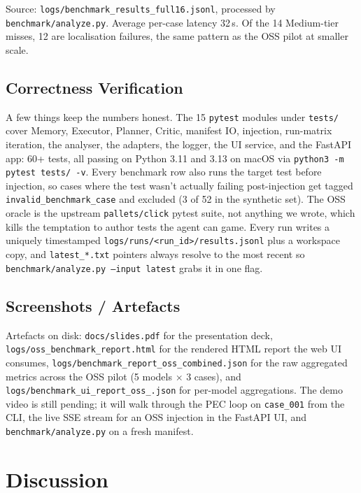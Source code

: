 \documentclass[11pt,letterpaper]{article}
\begin{document}
Source: \texttt{logs/benchmark\_results\_full16.jsonl}, processed by \texttt{benchmark/analyze.py}. Average per-case latency 32\,s. Of the 14 Medium-tier misses, 12 are localisation failures, the same pattern as the OSS pilot at smaller scale.

\subsection{Correctness Verification}

A few things keep the numbers honest. The 15 \texttt{pytest} modules under \texttt{tests/} cover Memory, Executor, Planner, Critic, manifest IO, injection, run-matrix iteration, the analyser, the adapters, the logger, the UI service, and the FastAPI app: 60+ tests, all passing on Python 3.11 and 3.13 on macOS via \texttt{python3 -m pytest tests/ -v}. Every benchmark row also runs the target test before injection, so cases where the test wasn't actually failing post-injection get tagged \texttt{invalid\_benchmark\_case} and excluded (3 of 52 in the synthetic set). The OSS oracle is the upstream \texttt{pallets/click} pytest suite, not anything we wrote, which kills the temptation to author tests the agent can game. Every run writes a uniquely timestamped \texttt{logs/runs/<run\_id>/results.jsonl} plus a workspace copy, and \texttt{latest\_*.txt} pointers always resolve to the most recent so \texttt{benchmark/analyze.py --input latest} grabs it in one flag.

\subsection{Screenshots / Artefacts}

Artefacts on disk: \texttt{docs/slides.pdf} for the presentation deck, \texttt{logs/oss\_\allowbreak benchmark\_\allowbreak report.html} for the rendered HTML report the web UI consumes, \texttt{logs/benchmark\_\allowbreak report\_\allowbreak oss\_\allowbreak combined.json} for the raw aggregated metrics across the OSS pilot (5 models $\times$ 3 cases), and \texttt{logs/benchmark\_\allowbreak ui\_\allowbreak report\_\allowbreak oss\_\allowbreak *.json} for per-model aggregations. The demo video is still pending; it will walk through the PEC loop on \texttt{case\_001} from the CLI, the live SSE stream for an OSS injection in the FastAPI UI, and \texttt{benchmark/analyze.py} on a fresh manifest.

\section{Discussion}
\end{document}
